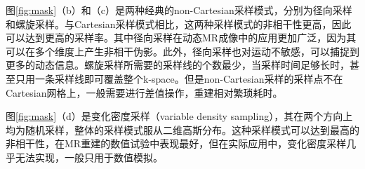 图\ref{fig:mask}（b）和（c）是两种经典的non-Cartesian采样模式，分别为径向采样\cite{block2007undersampled,glover1992projection}和螺旋采样\cite{meyer1992fast}。与Cartesian采样模式相比，这两种采样模式的非相干性更高，因此可以达到更高的采样率。其中径向采样在动态MR成像中的应用更加广泛，因为其可以在多个维度上产生非相干伪影。此外，径向采样也对运动不敏感，可以捕捉到更多的动态信息\cite{gai1996correction}。螺旋采样所需要的采样线的个数最少，当采样时间足够长时，甚至只用一条采样线即可覆盖整个k-space。但是non-Cartesian采样的采样点不在Cartesian网格上，一般需要进行差值操作，重建相对繁琐耗时。

图\ref{fig:mask}（d）是变化密度采样（variable density sampling），其在两个方向上均为随机采样，整体的采样模式服从二维高斯分布。这种采样模式可以达到最高的非相干性，在MR重建的数值试验中表现最好，但在实际应用中，变化密度采样几乎无法实现，一般只用于数值模拟。
